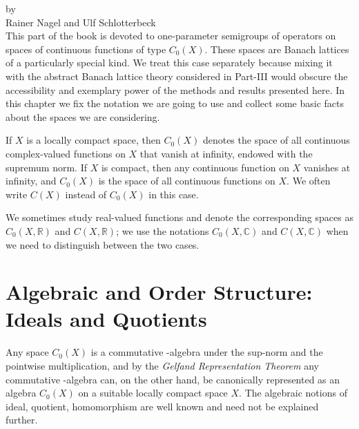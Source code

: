 \label{chap:b1}%
\thispagestyle{empty}
{\Large
\vspace*{-.75cm}
by \\[.25em]
Rainer Nagel and Ulf Schlotterbeck
\vspace{.75cm}
\\
}
This part of the book is devoted to one-parameter semigroups of operators on spaces of continuous functions of type $C_{0}(X)$.
These spaces are Banach lattices of a particularly special kind.
We treat this case separately because mixing it with the abstract Banach lattice theory considered in Part-III would obscure the accessibility and exemplary power of the methods and results presented here.
In this chapter we fix the notation we are going to use and collect some basic facts about the spaces we are considering.

If\/ $X$ is a locally compact space, then $C_{0}(X)$ denotes the space of all continuous complex-valued functions on $X$ that vanish at infinity, endowed with the supremum norm.
If\/ $X$ is compact, then any continuous function on $X$ vanishes at infinity, and $C_{0}(X)$ is the space of all continuous functions on $X$.
We often write $C(X)$ instead of\/ $C_{0}(X)$ in this case.

We sometimes study real-valued functions and denote the corresponding spaces as $C_{0}(X,\mathbb{R})$ and $C(X,\mathbb{R})$; we use the notations $C_{0}(X,\mathbb{C})$ and $C(X,\mathbb{C})$ when we need to distinguish between the two cases.
\section{Algebraic and Order Structure: Ideals and Quotients}\label{sec:b1-1}%
Any space $C_{0}(X)$ is a commutative \CA-algebra under the sup-norm and the pointwise multiplication, and by the \emph{Gelfand Representation Theorem} any commutative \CA-algebra can, on the other hand, be canonically represented as an algebra $C_{0}(X)$ on a suitable locally compact space $X$.
The algebraic notions of ideal, quotient, homomorphism are well known and need not be explained further.


